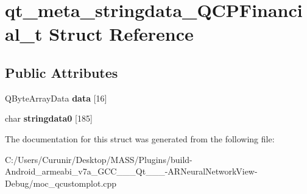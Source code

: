 \hypertarget{structqt__meta__stringdata___q_c_p_financial__t}{}\section{qt\+\_\+meta\+\_\+stringdata\+\_\+\+Q\+C\+P\+Financial\+\_\+t Struct Reference}
\label{structqt__meta__stringdata___q_c_p_financial__t}
\subsection*{Public Attributes}
\begin{DoxyCompactItemize}
\item 
\mbox{\label{structqt__meta__stringdata___q_c_p_financial__t_a4cb54630ee207a141d168257a0b9f11e}} 
Q\+Byte\+Array\+Data {\bfseries data} \mbox{[}16\mbox{]}
\item 
\mbox{\label{structqt__meta__stringdata___q_c_p_financial__t_a823f8ead49f5c06d31ffbaffd8695cc8}} 
char {\bfseries stringdata0} \mbox{[}185\mbox{]}
\end{DoxyCompactItemize}


The documentation for this struct was generated from the following file\+:\begin{DoxyCompactItemize}
\item 
C\+:/\+Users/\+Curunir/\+Desktop/\+M\+A\+S\+S/\+Plugins/build-\/\+Android\+\_\+armeabi\+\_\+v7a\+\_\+\+G\+C\+C\+\_\+\_\+\_\+\+Qt\+\_\+\_\+\_-\/\+A\+R\+Neural\+Network\+View-\/\+Debug/moc\+\_\+qcustomplot.\+cpp\end{DoxyCompactItemize}
